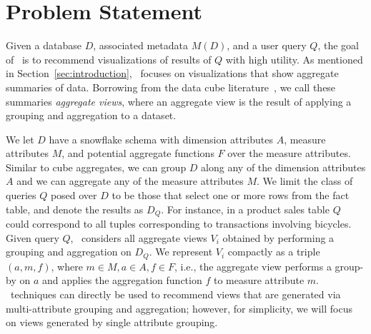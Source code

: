 

\section{Problem Statement}
\label{sec:problem_statement}

Given a database $D$, associated metadata $M(D)$, and a user query $Q$, the goal
of \SeeDB\ is to recommend visualizations of results of $Q$ with high utility. 
As mentioned in Section~\ref{sec:introduction}, \SeeDB\ focuses on visualizations 
that show aggregate summaries of data.
Borrowing from the data cube literature~\cite{olap}, 
we call these summaries {\it aggregate views}, where an aggregate view
is the result of applying a grouping and aggregation to a dataset.

We let $D$ have a snowflake schema with 
dimension attributes $A$, measure attributes $M$, and potential
aggregate functions $F$ over the measure attributes. 
Similar to cube aggregates, 
we can group $D$ along any of the dimension attributes $A$ 
and we can aggregate any of the measure attributes $M$.
We limit the class of queries $Q$ posed over $D$ to be
those that select one or more rows from the fact table, 
and denote the results as $D_Q$. 
For instance, in a product sales table $Q$ could correspond to
all tuples corresponding to transactions involving bicycles.
Given query $Q$, \SeeDB\ considers all aggregate views 
$V_i$ obtained by performing a grouping and aggregation on $D_Q$. 
We represent $V_i$ compactly as a triple $(a, m, f)$, where $m \in M, a \in A, f \in F$, 
i.e., the aggregate view 
performs a group-by on $a$ and applies the aggregation function $f$ to measure
attribute $m$. 
\SeeDB\ techniques can directly be used to recommend views that are
generated via multi-attribute grouping and aggregation; however,
for simplicity, we will focus on views generated by single attribute grouping. 



